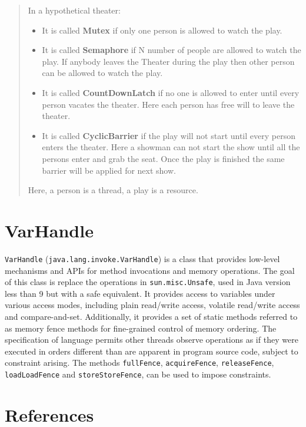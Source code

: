 \documentclass{latex/classes/myarticle}
\begin{document}
\begin{quote}
In a hypothetical theater:

\begin{itemize}
\item It is called \textbf{Mutex} if only one person is allowed to watch the play.
\item It is called \textbf{Semaphore} if N number of people are allowed to watch the
play. If anybody leaves the Theater during the play then other person can
be allowed to watch the play.
\item It is called \textbf{CountDownLatch} if no one is allowed to enter until every
person vacates the theater. Here each person has free will to leave the
theater.
\item It is called \textbf{CyclicBarrier} if the play will not start until every person
enters the theater. Here a showman can not start the show until all the
persons enter and grab the seat. Once the play is finished the same barrier
will be applied for next show.
\end{itemize}

Here, a person is a thread, a play is a resource.
\end{quote}

\section{VarHandle}
\label{sec:orgc0b140a}

\texttt{VarHandle} (\texttt{java.lang.invoke.VarHandle}) is a class that provides low-level
mechanisms and APIs for method invocations and memory operations. The goal of
this class is replace the operations in \texttt{sun.misc.Unsafe}, used in Java version
less than 9 but with a safe equivalent. It provides access to variables under
various access modes, including plain read/write access, volatile read/write
access and compare-and-set. Additionally, it provides a set of static methods
referred to as memory fence methods for fine-grained control of memory
ordering. The specification of language permits other threads observe
operations as if they were executed in orders different than are apparent in
program source code, subject to constraint arising. The methods \texttt{fullFence},
\texttt{acquireFence}, \texttt{releaseFence}, \texttt{loadLoadFence} and \texttt{storeStoreFence}, can be used to
impose constraints.


\section{References}
\label{sec:org07c446a}
\end{document}
